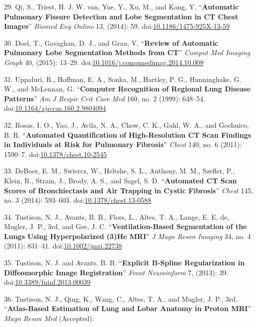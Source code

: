 \documentclass[11pt,]{article}
\begin{document}
29. Qi, S., Triest, H. J. W. van, Yue, Y., Xu, M., and Kang, Y.
``\textbf{Automatic Pulmonary Fissure Detection and Lobe Segmentation in
CT Chest Images}'' \emph{Biomed Eng Online} 13, (2014): 59.
doi:\href{http://dx.doi.org/10.1186/1475-925X-13-59}{10.1186/1475-925X-13-59}

30. Doel, T., Gavaghan, D. J., and Grau, V. ``\textbf{Review of
Automatic Pulmonary Lobe Segmentation Methods from CT}'' \emph{Comput
Med Imaging Graph} 40, (2015): 13--29.
doi:\href{http://dx.doi.org/10.1016/j.compmedimag.2014.10.008}{10.1016/j.compmedimag.2014.10.008}

31. Uppaluri, R., Hoffman, E. A., Sonka, M., Hartley, P. G.,
Hunninghake, G. W., and McLennan, G. ``\textbf{Computer Recognition of
Regional Lung Disease Patterns}'' \emph{Am J Respir Crit Care Med} 160,
no. 2 (1999): 648--54.
doi:\href{http://dx.doi.org/10.1164/ajrccm.160.2.9804094}{10.1164/ajrccm.160.2.9804094}

32. Rosas, I. O., Yao, J., Avila, N. A., Chow, C. K., Gahl, W. A., and
Gochuico, B. R. ``\textbf{Automated Quantification of High-Resolution CT
Scan Findings in Individuals at Risk for Pulmonary Fibrosis}''
\emph{Chest} 140, no. 6 (2011): 1590--7.
doi:\href{http://dx.doi.org/10.1378/chest.10-2545}{10.1378/chest.10-2545}

33. DeBoer, E. M., Swiercz, W., Heltshe, S. L., Anthony, M. M., Szefler,
P., Klein, R., Strain, J., Brody, A. S., and Sagel, S. D.
``\textbf{Automated CT Scan Scores of Bronchiectasis and Air Trapping in
Cystic Fibrosis}'' \emph{Chest} 145, no. 3 (2014): 593--603.
doi:\href{http://dx.doi.org/10.1378/chest.13-0588}{10.1378/chest.13-0588}

34. Tustison, N. J., Avants, B. B., Flors, L., Altes, T. A., Lange, E.
E. de, Mugler, J. P., 3rd, and Gee, J. C. ``\textbf{Ventilation-Based
Segmentation of the Lungs Using Hyperpolarized (3)He MRI}'' \emph{J Magn
Reson Imaging} 34, no. 4 (2011): 831--41.
doi:\href{http://dx.doi.org/10.1002/jmri.22738}{10.1002/jmri.22738}

35. Tustison, N. J. and Avants, B. B. ``\textbf{Explicit B-Spline
Regularization in Diffeomorphic Image Registration}'' \emph{Front
Neuroinform} 7, (2013): 39.
doi:\href{http://dx.doi.org/10.3389/fninf.2013.00039}{10.3389/fninf.2013.00039}

36. Tustison, N. J., Qing, K., Wang, C., Altes, T. A., and Mugler, J.
P., 3rd. ``\textbf{Atlas-Based Estimation of Lung and Lobar Anatomy in
Proton MRI}'' \emph{Magn Reson Med} (Accepted):
\end{document}
